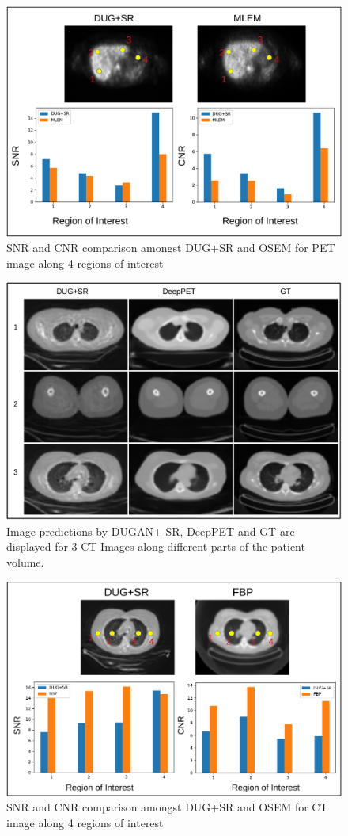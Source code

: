\begin{figure}[!htbp]
	\centering
	\includegraphics[width=0.8\linewidth]{./Figures/PET_MLEM-crop.pdf}
	\caption{\ac{SNR} and \ac{CNR} comparison amongst DUG+SR and OSEM for \ac{PET} image along 4 regions of interest}
	\label{fig:PET_roi}
\end{figure}

\begin{figure}[!htbp]
	\centering
	\includegraphics[width=0.8\linewidth]{./Figures/CT_with_dp-crop.pdf}
	\caption{Image predictions by \ac{DUGAN}+ \ac{SR}, DeepPET and \ac{GT} are displayed for 3 \ac{CT} Images along different parts of the patient volume.}
	\label{fig:CT_results}
\end{figure}


\begin{figure}[!htbp]
	\centering
	\includegraphics[width=0.8\linewidth]{./Figures/CT_roi2-crop.pdf}
	\caption{\ac{SNR} and \ac{CNR} comparison amongst DUG+SR and OSEM for \ac{CT} image along 4 regions of interest}
	\label{fig:CT_roi}
\end{figure}



